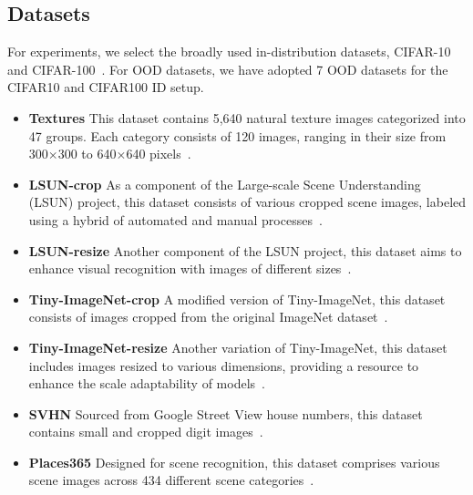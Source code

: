\documentclass[letterpaper]{article} %
\begin{document}
\subsection{Datasets}
\vspace{-0.1cm}
For experiments, we select the broadly used in-distribution datasets, CIFAR-10 and CIFAR-100~\cite{cifar}.
For OOD datasets, we have adopted 7 OOD datasets for the CIFAR10 and CIFAR100 ID setup.
\vspace{-0.1cm}
\begin{itemize}
    \item \textbf{Textures} This dataset contains 5,640 natural texture images categorized into 47 groups. Each category consists of 120 images, ranging in their size from 300$\times$300 to 640$\times$640 pixels~\cite{textures}.
    \item \textbf{LSUN-crop} As a component of the Large-scale Scene Understanding (LSUN) project, this dataset consists of various cropped scene images, labeled using a hybrid of automated and manual processes~\cite{LSUN}.
    \item \textbf{LSUN-resize} Another component of the LSUN project, this dataset aims to enhance visual recognition with images of different sizes~\cite{LSUN}.
    \item \textbf{Tiny-ImageNet-crop}  A modified version of Tiny-ImageNet, this dataset consists of images cropped from the original ImageNet dataset~\cite{TinyImageNet}.
    \item \textbf{Tiny-ImageNet-resize} Another variation of Tiny-ImageNet, this dataset includes images resized to various dimensions, providing a resource to enhance the scale adaptability of models~\cite{TinyImageNet}.
    \item \textbf{SVHN} Sourced from Google Street View house numbers, this dataset contains small and cropped digit images~\cite{SVHN}.
    \item \textbf{Places365} Designed for scene recognition, this dataset comprises various scene images across 434 different scene categories~\cite{Places365}. 
\end{itemize}
\vspace{-0.1cm}
\end{document}
